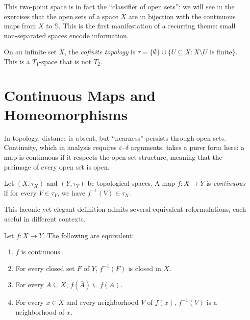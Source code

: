 This two-point space is in fact the ``classifier of open sets'': we will see
in the exercises that the open sets of a space $X$ are in bijection with the
continuous maps from $X$ to $\mathbb{S}$. This is the first manifestation of
a recurring theme: small non-separated spaces encode information.

\begin{example}
On an infinite set $X$, the \emph{cofinite topology} is
$\tau = \{\emptyset\} \cup \{U \subseteq X : X \setminus U \text{ is finite}\}$.
This is a $T_1$-space that is not $T_2$.
\end{example}

\section{Continuous Maps and Homeomorphisms}

In topology, distance is absent, but ``nearness'' persists through open
sets. Continuity, which in analysis requires $\varepsilon$--$\delta$
arguments, takes a purer form here: a map is continuous if it respects the
open-set structure, meaning that the preimage of every open set is open.

\begin{definition}
Let $(X,\tau_X)$ and $(Y,\tau_Y)$ be topological spaces. A map $f\colon X \to Y$ is
\emph{continuous} if for every $V \in \tau_Y$, we have $f^{-1}(V) \in \tau_X$.
\end{definition}

This laconic yet elegant definition admits several equivalent
reformulations, each useful in different contexts.

\begin{proposition}
Let $f\colon X \to Y$. The following are equivalent:
\begin{enumerate}
  \item $f$ is continuous.
  \item For every closed set $F$ of $Y$, $f^{-1}(F)$ is closed in $X$.
  \item For every $A \subseteq X$, $f(\overline{A}) \subseteq \overline{f(A)}$.
  \item For every $x \in X$ and every neighborhood $V$ of $f(x)$, $f^{-1}(V)$ is a
    neighborhood of $x$.
\end{enumerate}
\end{proposition}

